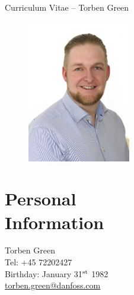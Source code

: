 \documentclass[margin,line,a4paper]{resume}
\begin{document}
{\sc \Large Curriculum Vitae -- Torben Green}
\begin{resume}
    \vspace{0.5cm}
    \begin{figure}
      \vspace{-1cm}
      \begin{center}
        \includegraphics[width=0.4\textwidth]{TOG_visitkort}
      \end{center}
      \vspace{-1cm}
    \end{figure}

    \section{\mysidestyle Personal\\Information}%
    Torben Green \\
    Tel: +45 72202427 \\
    Birthday: January 31$^{\rm st}$ 1982\\
    \href{mailto:torben.green@danfoss.com}{torben.green@danfoss.com} \\


\end{resume}
\end{document}
